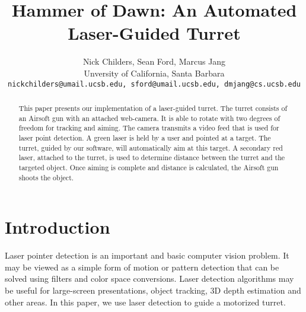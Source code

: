 \documentclass[10pt,twocolumn,letterpaper]{article}
\begin{document}
\title{Hammer of Dawn: An Automated Laser-Guided Turret}

\author{Nick Childers, Sean Ford, Marcus Jang\\
Unversity of California, Santa Barbara\\
{\tt\small nickchilders@umail.ucsb.edu, sford@umail.ucsb.edu, dmjang@cs.ucsb.edu}
}

\maketitle
\thispagestyle{empty}

\begin{abstract}
This paper presents our implementation of a laser-guided turret. The turret consists of an Airsoft gun with an attached web-camera.  It is able to rotate with two degrees of freedom for tracking and aiming.  The camera transmits a video feed that is used for laser point detection.  A green laser is held by a user and pointed at a target.  The turret, guided by our software, will automatically aim at this target.  A secondary red laser, attached to the turret, is used to determine distance between the turret and the targeted object.  Once aiming is complete and distance is calculated, the Airsoft gun shoots the object.
\end{abstract}

\section{Introduction}

Laser pointer detection is an important and basic computer vision problem.  It may be viewed as a simple form of motion or pattern detection that can be solved using filters and color space conversions.  Laser detection algorithms may be useful for large-screen presentations, object tracking, 3D depth estimation and other areas.  In this paper, we use laser detection to guide a motorized turret.
\end{document}
